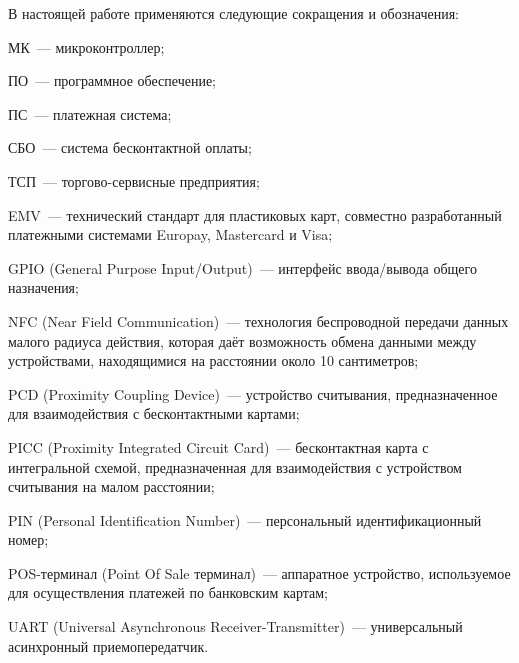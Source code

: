 \newpage


В настоящей работе применяются следующие сокращения и обозначения:

\begin{description}

	\item МК~--- микроконтроллер;
	\item ПО~--- программное обеспечение;
	\item ПС~--- платежная система;
	\item СБО~--- система бесконтактной оплаты;
	\item ТСП~--- торгово-сервисные предприятия;

	\item EMV~--- технический стандарт для пластиковых карт, совместно разработанный платежными системами Europay, Mastercard и Visa;
	\item GPIO (General Purpose Input/Output)~--- интерфейс ввода/вывода общего назначения;
	\item NFC (Near Field Communication)~--- технология беспроводной передачи данных малого радиуса действия, которая даёт возможность обмена данными между устройствами, находящимися на расстоянии около 10 сантиметров;
	\item PCD (Proximity Coupling Device)~--- устройство считывания, предназначенное для взаимодействия с бесконтактными картами;
	\item PICC (Proximity Integrated Circuit Card)~--- бесконтактная карта с интегральной схемой, предназначенная для взаимодействия с устройством считывания на малом расстоянии;
	\item PIN (Personal Identification Number)~--- персональный идентификационный номер;
	\item POS-терминал (Point Of Sale терминал)~--- аппаратное устройство, используемое для осуществления платежей по банковским картам;
	\item UART (Universal Asynchronous Receiver-Transmitter)~--- универсальный асинхронный приемопередатчик.

\item \end{description}
